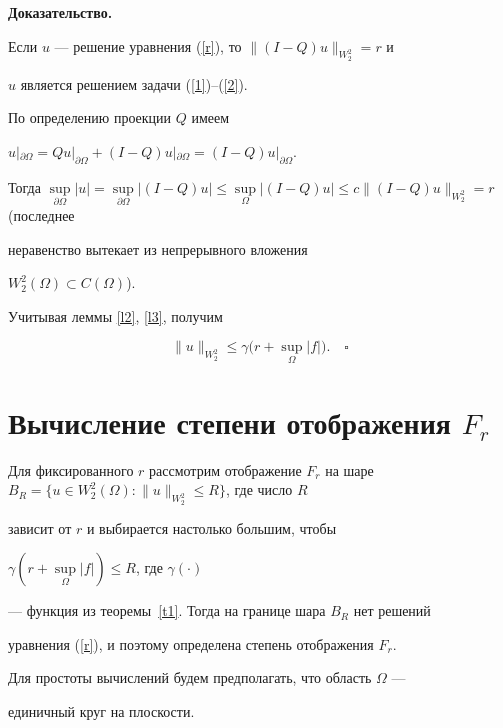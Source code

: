 {\bf Доказательство.}


Если $u$ --- решение уравнения (\ref{r}), то $\|(I-Q)u\|_{W^2_2}=r$ и


$u$ является решением задачи (\ref{1})--(\ref{2}).





По определению проекции $Q$ имеем


$u|_{\partial \Omega}=Qu|_{\partial \Omega}+(I-Q)u|_{\partial


\Omega}=(I-Q)u|_{\partial \Omega}$.


Тогда $\sup \limits_{\partial \Omega }|u|=


\sup \limits_{\partial \Omega }|(I-Q)u|\le


\sup \limits_{\Omega }|(I-Q)u|\le c\|(I-Q)u\|_{W^2_2}=r$ (последнее


неравенство вытекает из непрерывного вложения


$W^2_2(\Omega)\subset C(\Omega)$).


Учитывая леммы \ref{l2}, \ref{l3}, получим


$$


\|u\|_{W^2_2}\le \gamma\big(r+\sup \limits_\Omega |f|\big).\quad\square


$$





\section{Вычисление степени отображения $F_r$}\label{fr}





Для фиксированного $r$ рассмотрим отображение $F_r$ на шаре $B_R=


\{u\in W^2_2(\Omega): \|u\|_{W^2_2}\le R\}$, где число $R$


зависит от $r$ и выбирается настолько большим, чтобы 


$\gamma(r+\sup\limits_\Omega |f|)\le R$, где $\gamma(\cdot)$


--- функция из теоремы~\ref{t1}. Тогда на границе шара $B_R$ нет решений


уравнения (\ref{r}), и поэтому определена степень отображения $F_r$.





Для простоты вычислений будем предполагать, что область $\Omega $ ---


единичный круг на плоскости. 






